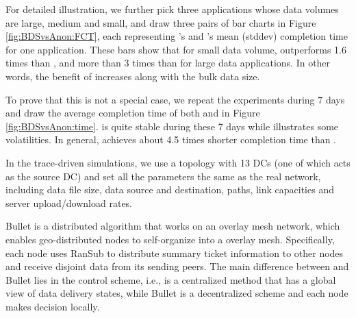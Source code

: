 For detailed illustration, we further pick three applications whose data volumes are large, medium and small, and draw three pairs of bar charts in Figure \ref{fig:BDSvsAnon:FCT}, each representing \name's and \company's mean (stddev) completion time for one application. These bars show that for small data volume, \name outperforms 1.6 times than \company, and more than 3 times than \company for large data applications. In other words, the benefit of \name increases along with the bulk data size.

To prove that this is not a special case, we repeat the experiments during 7 days and draw the average completion time of both \name and \company in Figure \ref{fig:BDSvsAnon:time}. \name is quite stable during these 7 days while \company illustrates some volatilities. In general, \name achieves about 4.5 times shorter completion time than \company.



In the trace-driven simulations, we use a topology with 13 DCs (one of which acts as the source DC) and set all the parameters the same as the real network, including data file size, data source and destination, paths, link capacities and server upload/download rates.

Bullet \cite{kostic2003bullet} is a distributed algorithm that works on an overlay mesh network, which enables geo-distributed nodes to self-organize into a overlay mesh. Specifically, each node uses RanSub \cite{Rodriguez2003Using} to distribute summary ticket information to other nodes and receive disjoint data from its sending peers. The main difference between \name and Bullet lies in the control scheme, i.e., \name is a centralized method that has a global view of data delivery states, while Bullet is a decentralized scheme and each node makes decision locally.

